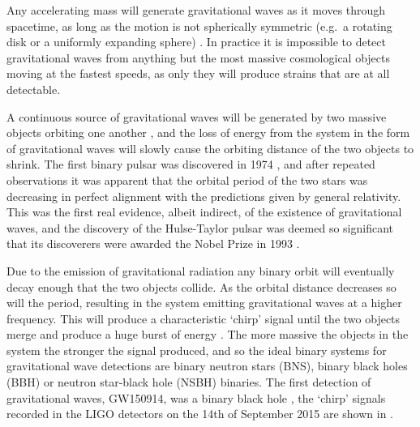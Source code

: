 \begin{colsection}
\begin{colsection}
Any accelerating mass will generate gravitational waves as it moves through spacetime, as long as the motion is not spherically symmetric (e.g.\ a rotating disk or a uniformly expanding sphere) \citep{BIGcardiff,BIGparis}. In practice it is impossible to detect gravitational waves from anything but the most massive cosmological objects moving at the fastest speeds, as only they will produce strains that are at all detectable.

A continuous source of gravitational waves will be generated by two massive objects orbiting one another \citep{GW_sources}, and the loss of energy from the system in the form of gravitational waves will slowly cause the orbiting distance of the two objects to shrink. The first binary pulsar was discovered in 1974 \citep{HulseTaylor}, and after repeated observations it was apparent that the orbital period of the two stars was decreasing in perfect alignment with the predictions given by general relativity. This was the first real evidence, albeit indirect, of the existence of gravitational waves, and the discovery of the Hulse-Taylor pulsar was deemed so significant that its discoverers were awarded the Nobel Prize in 1993 \citep{HulseTaylor2}.

Due to the emission of gravitational radiation any binary orbit will eventually decay enough that the two objects collide. As the orbital distance decreases so will the period, resulting in the system emitting gravitational waves at a higher frequency. This will produce a characteristic `chirp' signal until the two objects merge and produce a huge burst of energy \citep{GW_sources, BIGparis}. The more massive the objects in the system the stronger the signal produced, and so the ideal binary systems for gravitational wave detections are binary neutron stars (BNS), binary black holes (BBH) or neutron star-black hole (NSBH) binaries. The first detection of gravitational waves, GW150914, was a binary black hole \citep{GW150914}, the `chirp' signals recorded in the LIGO detectors on the 14th of September 2015 are shown in .



\end{colsection}
\end{colsection}
